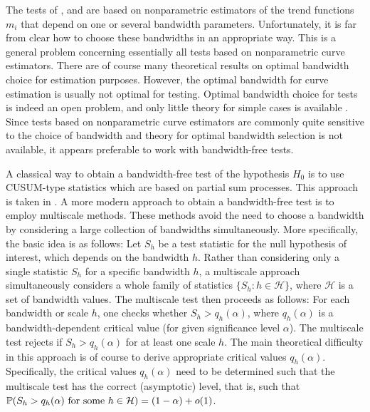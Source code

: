 \documentclass[a4paper,12pt]{article}
\begin{document}
The tests of \cite{Zhang2012}, \cite{DegrasWu2012} and \cite{ChenWu2018} are based on nonparametric estimators of the trend functions $m_i$ that depend on one or several bandwidth parameters. Unfortunately, it is far from clear how to choose these bandwidths in an appropriate way. This is a general problem concerning essentially all tests based on nonparametric curve estimators. There are of course many theoretical results on optimal bandwidth choice for estimation purposes. However, the optimal bandwidth for curve estimation is usually not optimal for testing. Optimal bandwidth choice for tests is indeed an open problem, and only little theory for simple cases is available \citep[cp.][]{GaoGijbels2008}. Since tests based on nonparametric curve estimators are commonly quite sensitive to the choice of bandwidth and theory for optimal bandwidth selection is not available, it appears preferable to work with bandwidth-free tests. 


A classical way to obtain a bandwidth-free test of the hypothesis $H_0$ is to use CUSUM-type statistics which are based on partial sum processes. This approach is taken in \cite{Hidalgo2014}. A more modern approach to obtain a bandwidth-free test is to employ multiscale methods. These methods avoid the need to choose a bandwidth by considering a large collection of bandwidths simultaneously. More specifically, the basic idea is as follows: Let $S_h$ be a test statistic for the null hypothesis of interest, which depends on the bandwidth $h$. Rather than considering only a single statistic $S_h$ for a specific bandwidth $h$, a multiscale approach simultaneously considers a whole family of statistics $\{S_h: h \in \mathcal{H} \}$, where $\mathcal{H}$ is a set of bandwidth values. The multiscale test then proceeds as follows: For each bandwidth or scale $h$, one checks whether $S_h > q_h(\alpha)$, where $q_h(\alpha)$ is a bandwidth-dependent critical value (for given significance level $\alpha$). The multiscale test rejects if $S_h > q_h(\alpha)$ for at least one scale $h$. The main theoretical difficulty in this approach is of course to derive appropriate critical values $q_h(\alpha)$. Specifically, the critical values $q_h(\alpha)$ need to be determined such that the multiscale test has the correct (asymptotic) level, that is, such that $\mathbb{P} (S_h > q_h(\alpha) \text{ for some } h \in \mathcal{H} ) = (1-\alpha) + o(1)$. 
\end{document}

